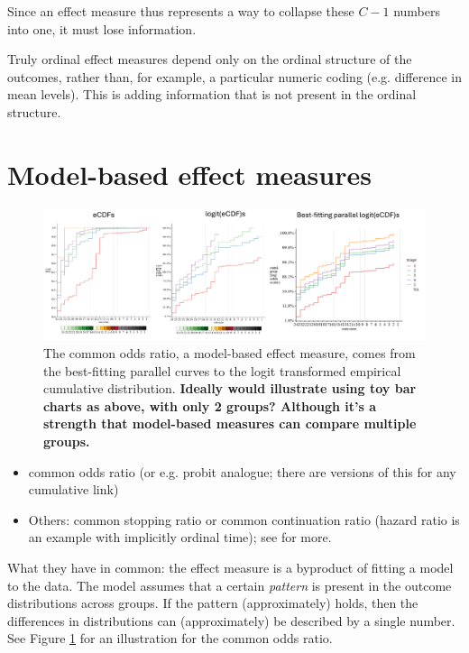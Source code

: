 \documentclass[
  11pt,
  fleqn
]{article}
\begin{document}
Since an effect measure thus represents a way to collapse these $C-1$
numbers into one, it must lose information.

Truly ordinal effect measures depend only on the ordinal structure of
the outcomes, rather than, for example, a particular numeric coding
(e.g. difference in mean levels). This is adding
information that is not present in the ordinal structure.

\section{Model-based effect measures}

\begin{figure}
  \includegraphics[width=7in]{illustrating_common_or.pdf}
  \caption{The common odds ratio, a model-based effect measure, comes
    from the best-fitting parallel curves to the logit transformed
    empirical cumulative distribution. \textbf{Ideally would illustrate
      using toy bar charts as above, with only 2 groups? Although it's a
  strength that model-based measures can compare multiple groups.}}
  \label{fig:illustrating_or}
\end{figure}

\begin{itemize}
  \item
    common odds ratio (or e.g. probit analogue; there are versions of
    this for any cumulative link)
  \item Others: common stopping ratio or common continuation
    ratio (hazard ratio is an example with implicitly ordinal time);
    see
    \citet{burknerOrdinalRegressionModels2019,agrestiAnalysisOrdinalCategorical2010}
    for more.
\end{itemize}

What they have in common: the effect measure is a byproduct of fitting a model
to the data.
The model assumes that a certain \emph{pattern} is present in the outcome
distributions across groups. If the pattern (approximately) holds,
then the differences in
distributions can (approximately) be described by a single number.
See Figure \ref{fig:illustrating_or} for an illustration
for the common odds ratio.
\end{document}
